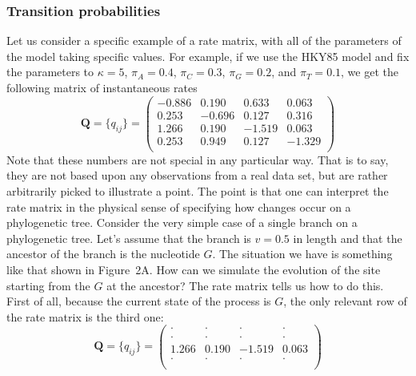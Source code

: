 \documentclass{svmult}
\begin{document}
\subsubsection{Transition probabilities} Let us consider a specific example of a rate matrix, with
all of the parameters of the model taking specific values. For example, if we use the HKY85 model
and fix the parameters to $\kappa = 5$, $\pi_A = 0.4$, $\pi_C = 0.3$, $\pi_G = 0.2$, and $\pi_T =
0.1$, we get the following matrix of instantaneous rates
$$
{\mathbf Q} = \{q_{ij}\} = \left( \begin{array}{rrrr}
-0.886 &  0.190 &  0.633 &  0.063 \\
 0.253 & -0.696 &  0.127 &  0.316 \\
 1.266 &  0.190 & -1.519 &  0.063 \\
 0.253 &  0.949 &  0.127 & -1.329 \\
\end{array} \right)
$$
Note that these numbers are not special in any particular way. That is to say, they are not based
upon any observations from a real data set, but are rather arbitrarily picked to illustrate a
point. The point is that one can interpret the rate matrix in the physical sense of specifying how
changes occur on a phylogenetic tree. Consider the very simple case of a single branch on a
phylogenetic tree. Let's assume that the branch is $v=0.5$ in length and that the ancestor of the
branch is the nucleotide $G$. The situation we have is something like that shown in Figure~2A. How
can we simulate the evolution of the site starting from the $G$ at the ancestor? The rate matrix
tells us how to do this. First of all, because the current state of the process is $G$,  the only
relevant row of the rate matrix is the third one:
$$
{\mathbf Q} = \{q_{ij}\} = \left( \begin{array}{cccc}
\cdot   &   \cdot &    \cdot &  \cdot \\
\cdot   &   \cdot &    \cdot &  \cdot \\
1.266 &  0.190 & -1.519 &  0.063 \\
\cdot   &   \cdot &    \cdot & \cdot \\
\end{array} \right)
$$
\end{document}
